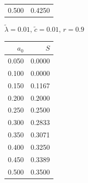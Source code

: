 \documentclass[11pt,a4paper]{article}
\begin{document}
\begin{minipage}[t]{\textwidth}
\begin{minipage}[t]{0.32\textwidth}
\begin{tabular}[t]{rr}
             0.500 & 0.4250 \\
        \end{tabular}
    \end{minipage}
    \begin{minipage}[t]{0.32\textwidth}
        \footnotesize
        \begin{flushleft}$\tilde{\lambda}=0.01$, $\tilde{c}=0.01$, $r=0.9$\end{flushleft}
        \begin{tabular}[t]{rr}
            $a_0$ & $S$ \\
            \hline
             0.050 & 0.0000 \\
             0.100 & 0.0000 \\
             0.150 & 0.1167 \\
             0.200 & 0.2000 \\
             0.250 & 0.2500 \\
             0.300 & 0.2833 \\
             0.350 & 0.3071 \\
             0.400 & 0.3250 \\
             0.450 & 0.3389 \\
             0.500 & 0.3500 \\
        \end{tabular}
    \end{minipage}
\end{minipage}
\end{document}
